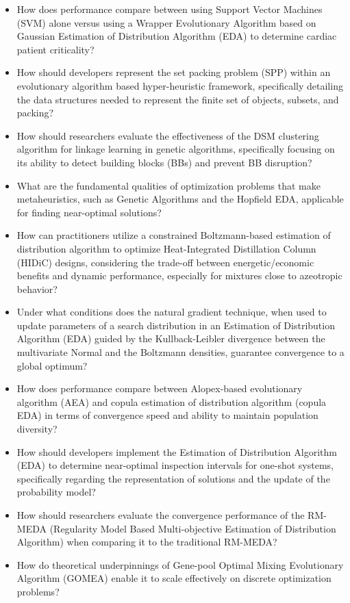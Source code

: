 \begin{itemize}[noitemsep]
    \item How does performance compare between using Support Vector Machines (SVM) alone versus using a Wrapper Evolutionary Algorithm based on Gaussian Estimation of Distribution Algorithm (EDA) to determine cardiac patient criticality?
    \item How should developers represent the set packing problem (SPP) within an evolutionary algorithm based hyper-heuristic framework, specifically detailing the data structures needed to represent the finite set of objects, subsets, and packing?
    \item How should researchers evaluate the effectiveness of the DSM clustering algorithm for linkage learning in genetic algorithms, specifically focusing on its ability to detect building blocks (BBs) and prevent BB disruption?
    \item What are the fundamental qualities of optimization problems that make metaheuristics, such as Genetic Algorithms and the Hopfield EDA, applicable for finding near-optimal solutions?
    \item How can practitioners utilize a constrained Boltzmann-based estimation of distribution algorithm to optimize Heat-Integrated Distillation Column (HIDiC) designs, considering the trade-off between energetic/economic benefits and dynamic performance, especially for mixtures close to azeotropic behavior?
    \item Under what conditions does the natural gradient technique, when used to update parameters of a search distribution in an Estimation of Distribution Algorithm (EDA) guided by the Kullback-Leibler divergence between the multivariate Normal and the Boltzmann densities, guarantee convergence to a global optimum?
    \item How does performance compare between Alopex-based evolutionary algorithm (AEA) and copula estimation of distribution algorithm (copula EDA) in terms of convergence speed and ability to maintain population diversity?
    \item How should developers implement the Estimation of Distribution Algorithm (EDA) to determine near-optimal inspection intervals for one-shot systems, specifically regarding the representation of solutions and the update of the probability model?
    \item How should researchers evaluate the convergence performance of the RM-MEDA (Regularity Model Based Multi-objective Estimation of Distribution Algorithm) when comparing it to the traditional RM-MEDA?
    \item How do theoretical underpinnings of Gene-pool Optimal Mixing Evolutionary Algorithm (GOMEA) enable it to scale effectively on discrete optimization problems?

\end{itemize}
